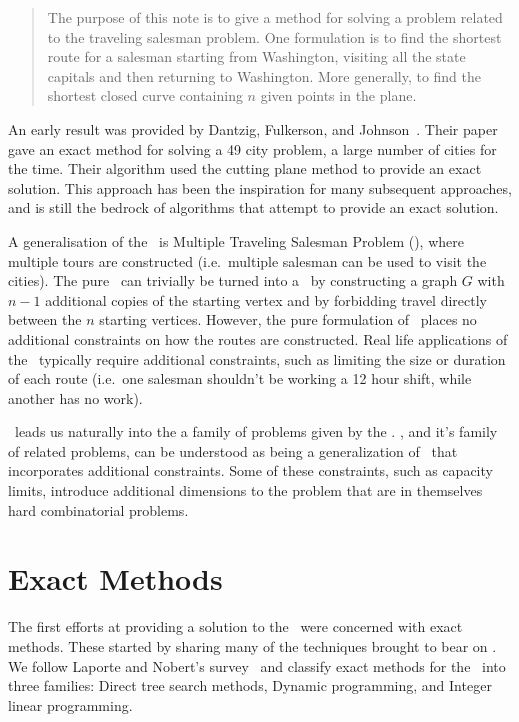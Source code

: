    \begin{quote}
   The purpose of this note is to give a method for solving a problem related to the traveling salesman problem. One formulation is to find the shortest route for a salesman starting from Washington, visiting all the state capitals and then returning to Washington. More generally, to find the shortest closed curve containing $n$ given points in the plane.
   \end{quote}

An early result was provided by Dantzig, Fulkerson, and  Johnson~\cite{Dantzig:1954}. Their paper gave an exact method for solving a 49 city problem, a large number of cities for the time. Their algorithm used the cutting plane method to provide an exact solution. This approach has been the inspiration for many subsequent approaches, and is still the bedrock of algorithms that attempt to provide an exact solution.  

A generalisation of the \TSP\ is Multiple Traveling Salesman Problem (\MTSP), where multiple tours are constructed (i.e.~multiple salesman can be used to visit the cities). The pure \MTSP\ can trivially be turned into a \TSP\ by constructing a graph $G$ with $n - 1$ additional copies of the starting vertex and by forbidding travel directly between the $n$ starting vertices. However, the pure formulation of \MTSP\ places no additional constraints on how the routes are constructed. Real life applications of the \MTSP\ typically require additional constraints, such as limiting the size or duration of each route (i.e.~one salesman shouldn't be working a 12 hour shift, while another has no work).

\MTSP\ leads us naturally into the a family of problems given by the \VRP. \VRP, and it's family of related problems, can be understood as being a generalization of \MTSP\ that incorporates additional constraints. Some of these constraints, such as capacity limits, introduce additional dimensions to the problem that are in themselves hard combinatorial problems.

\section{Exact Methods}
\label{sec:em}

The first efforts at providing a solution to the \VRP\ were concerned with exact methods. These started by sharing many of the techniques brought to bear on \TSP. We follow Laporte and Nobert's survey~\cite{LANO:87} and classify exact methods for the \VRP\ into three families: Direct tree search methods, Dynamic programming, and Integer linear programming.

